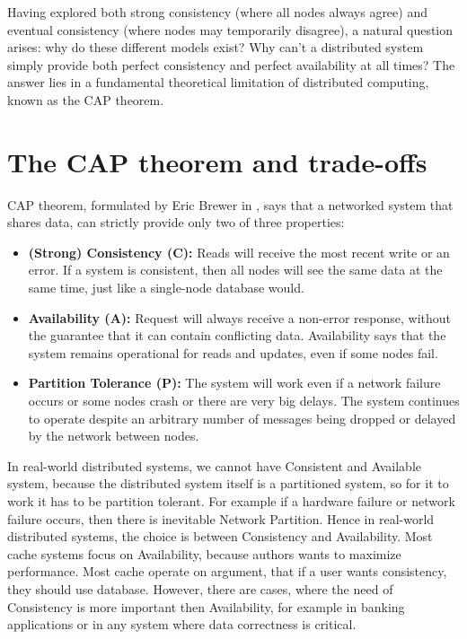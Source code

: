 \documentclass[shortabstract]{iithesis}
\begin{document}
Having explored both strong consistency (where all nodes always agree) and eventual consistency (where nodes may temporarily disagree), a natural question arises: why do these different models exist? Why can't a distributed system simply provide both perfect consistency and perfect availability at all times? The answer lies in a fundamental theoretical limitation of distributed computing, known as the CAP theorem.

\section{The CAP theorem and trade-offs}

CAP theorem, formulated by Eric Brewer in \cite{brewer}, says that a networked system that shares data, can strictly provide only two of three properties:
\begin{itemize}
    \item \textbf{(Strong) Consistency (C):} Reads will receive the most recent write or an error. If a system is consistent, then all nodes will see the same data at the same time, just like a single-node database would.
    \item \textbf{Availability (A):} Request will always receive a non-error response, without the guarantee that it can contain conflicting data. Availability says that the system remains operational for reads and updates, even if some nodes fail.
    \item \textbf{Partition Tolerance (P):} The system will work even if a network failure occurs or some nodes crash or there are very big delays. The system continues to operate despite an arbitrary number of messages being dropped or delayed by the network between nodes.
\end{itemize}

\noindent In real-world distributed systems, we cannot have Consistent and Available system, because the distributed system itself is a partitioned system, so for it to work it has to be partition tolerant. For example if a hardware failure or network failure occurs, then there is inevitable Network Partition. Hence in real-world distributed systems, the choice is between Consistency and Availability. Most cache systems focus on Availability, because authors wants to maximize performance. Most cache operate on argument, that if a user wants consistency, they should use database. However, there are cases, where the need of Consistency is more important then Availability, for example in banking applications or in any system where data correctness is critical.
\end{document}
